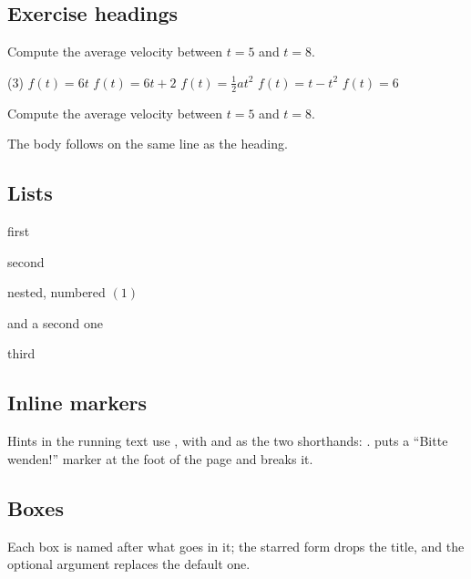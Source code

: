 \documentclass[factsheet, white, rounded, onehalfspacing, 11pt, a4paper]{msheet}
\newcommand{\commandToText}[1]{\texttt{\string#1}}
\begin{document}
\subsection{Exercise headings}

Compute the average velocity between $t = 5$ and $t = 8$.
\begin{mexccolumns}(3)
	\exc $f(t) = 6t$
	\exc $f(t) = 6t+2$
	\exc $f(t) = \frac{1}{2}at^2$
	\exc $f(t) = t-t^2$
	\exc $f(t) = 6$
\end{mexccolumns}

Compute the average velocity between $t = 5$ and $t = 8$.

The body follows on the same line as the heading.

\subsection{Lists}

\begin{menumerate}
	\item first
	\item second
	\begin{menumerate}
		\item nested, numbered $(1)$
		\item and a second one
	\end{menumerate}
	\item third
\end{menumerate}

\mibnp{}

\subsection{Inline markers}

Hints in the running text use \commandToText{\mtag}, with
\commandToText{\mtip} and \commandToText{\msolution} as the two shorthands:
\mtip[1] \msolution[1] .
\commandToText{\mibnp} puts a \enquote{Bitte wenden!} marker at the foot of the
page and breaks it.

\subsection{Boxes}

Each box is named after what goes in it; the starred form drops the title, and
the optional argument replaces the default one.
\end{document}
